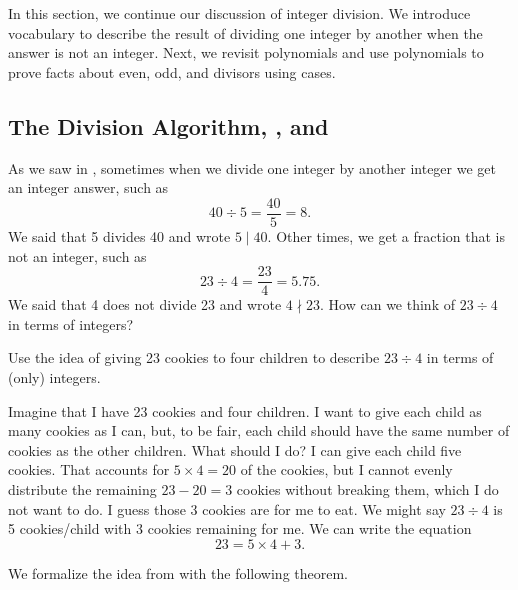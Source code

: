 \section{\secdivalg}
\label{sec_div_alg}
 
In this section, we continue our discussion of integer division.  We introduce vocabulary to describe the result of dividing one integer by another when the answer is not an integer.  Next, we revisit polynomials and use polynomials to prove facts about even, odd, and divisors using cases.

\newcommand{\subdivalg}{The Division Algorithm, , and }
\subsection{\subdivalg}
\label{sub_division_algorithm}

As we saw in , sometimes when we divide one integer by another integer we get an integer answer, such as $$40 \div 5 = \frac{40}{5} = 8.$$ We said that 5 divides 40 and wrote $5 \mid 40$. Other times, we get a fraction that is not an integer, such as $$23 \div 4= \frac{23}{4} = 5.75.$$ We said that 4 does not divide 23 and wrote $4 \nmid 23$. How can we think of $23 \div 4$ in terms of integers?  

\begin{exam}
\label{exam_cookies_children}
    Use the idea of giving 23 cookies to four children to describe $23 \div 4$ in terms of (only) integers.
    \begin{soln}
        Imagine that I have 23 cookies and four children.  I want to give each child as many cookies as I can, but, to be fair, each child should have the same number of cookies as the other children.  What should I do?  I can give each child five cookies. That accounts for $5 \times 4 = 20$ of the cookies, but I cannot evenly distribute the remaining $23-20=3$ cookies without breaking them, which I do not want to do.  I guess those 3 cookies are for me to eat.   We might say $23 \div 4$ is 5 cookies/child with 3 cookies remaining for me.  We can write the equation $$23 = 5 \times 4 + 3.$$
    \end{soln}
\end{exam}

We formalize the idea from  with the following theorem.  

